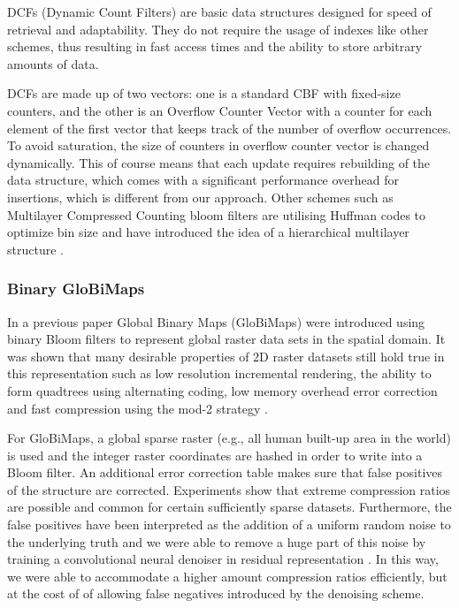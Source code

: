 \documentclass[sigconf]{acmart}
\begin{document}
DCFs (Dynamic Count Filters) \cite{aguilar-saborit_dynamic_2006} are basic data structures designed for speed of retrieval and adaptability. They do not require the usage of indexes like other schemes, thus resulting in fast access times and the ability to store arbitrary amounts of data.

DCFs are made up of two vectors: one is a standard CBF with fixed-size counters, and the other is an Overflow Counter Vector with a counter for each element of the first vector that keeps track of the number of overflow occurrences. To avoid saturation, the size of counters in overflow counter vector is changed dynamically.
This of course means that each update requires rebuilding of the data structure, which comes with a significant performance overhead for insertions, which is different from our approach.  Other schemes such as Multilayer Compressed Counting bloom filters are utilising Huffman codes to optimize bin size and have introduced the idea of a hierarchical multilayer structure \cite{ficara_multilayer_2008}.

\subsubsection{Binary GloBiMaps}

In a previous paper Global Binary Maps (GloBiMaps) were introduced using binary Bloom filters to represent global raster data sets in the spatial domain. It was shown that many desirable properties of 2D raster datasets still hold true in this representation such as low resolution incremental rendering, the ability to form quadtrees using alternating coding, low memory overhead error correction and fast compression using the mod-2 strategy \cite{werner2019globimaps}.

For GloBiMaps, a global sparse raster (e.g., all human built-up area in the world) is used and the integer raster coordinates are hashed in order to write into a Bloom filter. An additional error correction table makes sure that false positives of the structure are corrected. Experiments show that extreme compression ratios are possible and common for certain sufficiently sparse datasets. Furthermore, the false positives have been interpreted as the addition of a uniform random noise to the underlying truth and we were able to remove a huge part of this noise by training a convolutional neural denoiser in residual representation \cite{werner2021globimapsai}. In this way, we were able to accommodate a higher amount compression ratios efficiently, but at the cost of of allowing false negatives introduced by the denoising scheme.
\end{document}
